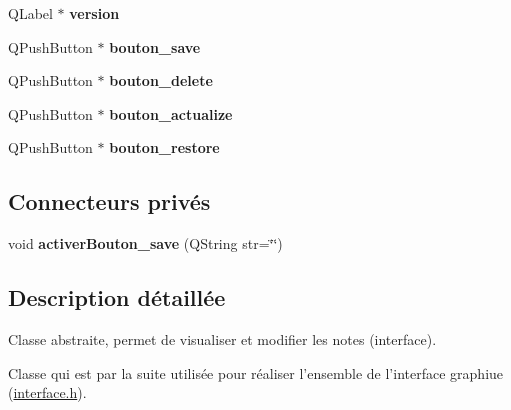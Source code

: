 \begin{DoxyCompactItemize}
\item 
\hypertarget{class_note_editeur_ac75b01a38244fb14c7698b54d47f8a8a}{Q\-Label $\ast$ {\bfseries version}}\label{class_note_editeur_ac75b01a38244fb14c7698b54d47f8a8a}

\item 
\hypertarget{class_note_editeur_a3015f12d14b3b625ee2f29198424a9d4}{Q\-Push\-Button $\ast$ {\bfseries bouton\-\_\-save}}\label{class_note_editeur_a3015f12d14b3b625ee2f29198424a9d4}

\item 
\hypertarget{class_note_editeur_a6fe2cfb5a9f5696cdacf642d2c1f09fa}{Q\-Push\-Button $\ast$ {\bfseries bouton\-\_\-delete}}\label{class_note_editeur_a6fe2cfb5a9f5696cdacf642d2c1f09fa}

\item 
\hypertarget{class_note_editeur_ae87a8477d85f55756face5df29284afd}{Q\-Push\-Button $\ast$ {\bfseries bouton\-\_\-actualize}}\label{class_note_editeur_ae87a8477d85f55756face5df29284afd}

\item 
\hypertarget{class_note_editeur_a286afb4660579ad82083d10ac9f862c7}{Q\-Push\-Button $\ast$ {\bfseries bouton\-\_\-restore}}\label{class_note_editeur_a286afb4660579ad82083d10ac9f862c7}

\end{DoxyCompactItemize}
\subsection*{Connecteurs privés}
\begin{DoxyCompactItemize}
\item 
\hypertarget{class_note_editeur_a445f7ca9fad98fc4a3d0de3ba546e4f0}{void {\bfseries activer\-Bouton\-\_\-save} (Q\-String str=\char`\"{}\char`\"{})}\label{class_note_editeur_a445f7ca9fad98fc4a3d0de3ba546e4f0}

\end{DoxyCompactItemize}


\subsection{Description détaillée}
Classe abstraite, permet de visualiser et modifier les notes (interface). 

Classe qui est par la suite utilisée pour réaliser l'ensemble de l'interface graphiue (\hyperlink{interface_8h}{interface.\-h}). 

